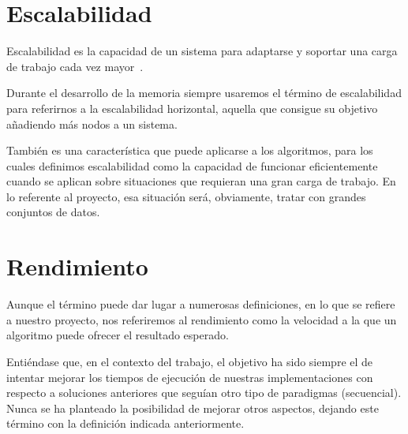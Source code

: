 \section{Escalabilidad}\label{sec:DefEscalabilidad}

Escalabilidad es la capacidad de un sistema para adaptarse y soportar una carga de trabajo cada vez mayor~\cite{Bondi:2000}.

Durante el desarrollo de la memoria siempre usaremos el término de escalabilidad para referirnos a la escalabilidad horizontal, aquella que consigue su objetivo añadiendo más nodos a un sistema.

También es una característica que puede aplicarse a los algoritmos, para los cuales definimos escalabilidad como la capacidad de funcionar eficientemente cuando se aplican sobre situaciones que requieran una gran carga de trabajo. En lo referente al proyecto, esa situación será, obviamente, tratar con grandes conjuntos de datos.

\section{Rendimiento}\label{sec:Rendimiento}

Aunque el término puede dar lugar a numerosas definiciones, en lo que se refiere a nuestro proyecto, nos referiremos al rendimiento como la velocidad a la que un algoritmo puede ofrecer el resultado esperado.

Entiéndase que, en el contexto del trabajo, el objetivo ha sido siempre el de intentar mejorar los tiempos de ejecución de nuestras implementaciones con respecto a soluciones anteriores que seguían otro tipo de paradigmas (secuencial). Nunca se ha planteado la posibilidad de mejorar otros aspectos, dejando este término con la definición indicada anteriormente.


